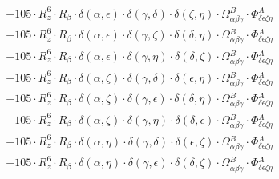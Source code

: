 \documentclass{article}
\begin{document}
\begin{equation}
\begin{array}{c}
 \\[0.2em] 		 + 105 \cdot R_{z}^{6} \cdot R_{\beta{}} \cdot \delta{}\left(\alpha{}, \epsilon{}\right) \cdot \delta{}\left(\gamma{}, \delta{}\right) \cdot \delta{}\left(\zeta{}, \eta{}\right) \cdot \Omega{}^{B}_{\alpha{}\beta{}\gamma{}} \cdot \Phi{}^{A}_{\delta{}\epsilon{}\zeta{}\eta{}} 
 \\[0.2em] 		 + 105 \cdot R_{z}^{6} \cdot R_{\beta{}} \cdot \delta{}\left(\alpha{}, \epsilon{}\right) \cdot \delta{}\left(\gamma{}, \zeta{}\right) \cdot \delta{}\left(\delta{}, \eta{}\right) \cdot \Omega{}^{B}_{\alpha{}\beta{}\gamma{}} \cdot \Phi{}^{A}_{\delta{}\epsilon{}\zeta{}\eta{}} 
 \\[0.2em] 		 + 105 \cdot R_{z}^{6} \cdot R_{\beta{}} \cdot \delta{}\left(\alpha{}, \epsilon{}\right) \cdot \delta{}\left(\gamma{}, \eta{}\right) \cdot \delta{}\left(\delta{}, \zeta{}\right) \cdot \Omega{}^{B}_{\alpha{}\beta{}\gamma{}} \cdot \Phi{}^{A}_{\delta{}\epsilon{}\zeta{}\eta{}} 
 \\[0.2em] 		 + 105 \cdot R_{z}^{6} \cdot R_{\beta{}} \cdot \delta{}\left(\alpha{}, \zeta{}\right) \cdot \delta{}\left(\gamma{}, \delta{}\right) \cdot \delta{}\left(\epsilon{}, \eta{}\right) \cdot \Omega{}^{B}_{\alpha{}\beta{}\gamma{}} \cdot \Phi{}^{A}_{\delta{}\epsilon{}\zeta{}\eta{}} 
 \\[0.2em] 		 + 105 \cdot R_{z}^{6} \cdot R_{\beta{}} \cdot \delta{}\left(\alpha{}, \zeta{}\right) \cdot \delta{}\left(\gamma{}, \epsilon{}\right) \cdot \delta{}\left(\delta{}, \eta{}\right) \cdot \Omega{}^{B}_{\alpha{}\beta{}\gamma{}} \cdot \Phi{}^{A}_{\delta{}\epsilon{}\zeta{}\eta{}} 
 \\[0.2em] 		 + 105 \cdot R_{z}^{6} \cdot R_{\beta{}} \cdot \delta{}\left(\alpha{}, \zeta{}\right) \cdot \delta{}\left(\gamma{}, \eta{}\right) \cdot \delta{}\left(\delta{}, \epsilon{}\right) \cdot \Omega{}^{B}_{\alpha{}\beta{}\gamma{}} \cdot \Phi{}^{A}_{\delta{}\epsilon{}\zeta{}\eta{}} 
 \\[0.2em] 		 + 105 \cdot R_{z}^{6} \cdot R_{\beta{}} \cdot \delta{}\left(\alpha{}, \eta{}\right) \cdot \delta{}\left(\gamma{}, \delta{}\right) \cdot \delta{}\left(\epsilon{}, \zeta{}\right) \cdot \Omega{}^{B}_{\alpha{}\beta{}\gamma{}} \cdot \Phi{}^{A}_{\delta{}\epsilon{}\zeta{}\eta{}} 
 \\[0.2em] 		 + 105 \cdot R_{z}^{6} \cdot R_{\beta{}} \cdot \delta{}\left(\alpha{}, \eta{}\right) \cdot \delta{}\left(\gamma{}, \epsilon{}\right) \cdot \delta{}\left(\delta{}, \zeta{}\right) \cdot \Omega{}^{B}_{\alpha{}\beta{}\gamma{}} \cdot \Phi{}^{A}_{\delta{}\epsilon{}\zeta{}\eta{}} 

\end{array}
\end{equation}
\end{document}
